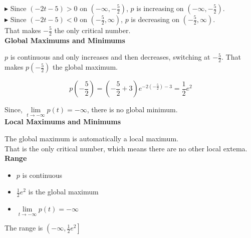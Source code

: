 \documentclass{ximera}
\begin{document}
\begin{example}
$\blacktriangleright$ Since $(-2t - 5) > 0$ on $\left( -\infty, -\frac{5}{2} \right)$, $p$ is increasing on $\left( -\infty, -\frac{5}{2} \right)$. \\


$\blacktriangleright$ Since $(-2t - 5) < 0$ on $\left( -\frac{5}{2}, \infty \right)$, $p$ is decreasing on $\left( -\frac{5}{2}, \infty \right)$. \\

That makes $-\frac{5}{2}$ the only critical number. \\


\textbf{Global Maximums and Minimums}


$p$ is continuous and only increases and then decreases, switching at $-\frac{5}{2}$.  That makes $p\left( -\frac{5}{2} \right)$ the global maximum.


\[
p\left( -\frac{5}{2} \right) = \left( -\frac{5}{2} + 3 \right ) e^{-2 \left( -\frac{5}{2} \right)- 3} = \frac{1}{2}  e^{2}  
\]



Since, $\lim\limits_{t \to -\infty} p(t) = -\infty$, there is no global minimum. \\




\textbf{Local Maximums and Minimums}


The global maximum is automatically a local maximum. \\

That is the only critical number, which means there are no other local extema. \\



\textbf{Range}


\begin{itemize}
  \item $p$ is continuous
  \item $\frac{1}{2}  e^{2}$ is the global maximum
  \item $\lim\limits_{t \to -\infty} p(t) = -\infty$
\end{itemize}

The range is $\left( -\infty, \frac{1}{2}  e^{2} \right]$









\end{example}
\end{document}
